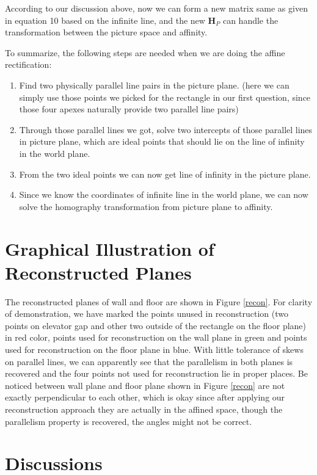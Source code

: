 \documentclass[conference]{IEEEtran}
\newcommand{\mat}[1]{\mathbf{#1}} %
\begin{document}
\noindent According to our discussion above, now we can form a new matrix same as given in equation 10 based on the infinite line, and the new $\mat{H}_P$ can handle the transformation between the picture space and affinity.

To summarize, the following steps are needed when we are doing the affine rectification:
\begin{enumerate}
	\item Find two physically parallel line pairs in the picture plane. (here we can simply use those points we picked for the rectangle in our first question, since those four apexes naturally provide two parallel line pairs)
	\item Through those parallel lines we got, solve two intercepts of those parallel lines in picture plane, which are ideal points that should lie on the line of infinity in the world plane.
	\item From the two ideal points we can now get line of infinity in the picture plane.
	\item Since we know the coordinates of infinite line in the world plane, we can now solve the homography transformation from picture plane to affinity.
\end{enumerate}

\section{Graphical Illustration of Reconstructed Planes}
The reconstructed planes of wall and floor are shown in Figure \ref{recon}. For clarity of demonstration, we have marked the points unused in reconstruction (two points on elevator gap and other two outside of the rectangle on the floor plane) in red color, points used for reconstruction on the wall plane in green and points used for reconstruction on the floor plane in blue. With little tolerance of skews on parallel lines, we can apparently see that the parallelism in both planes is recovered and the four points not used for reconstruction lie in proper places. Be noticed between wall plane and floor plane shown in Figure \ref{recon} are not exactly perpendicular to each other, which is okay since after applying our reconstruction approach they are actually in the affined space, though the parallelism property is recovered, the angles might not be correct.

\section{Discussions}
\end{document}
